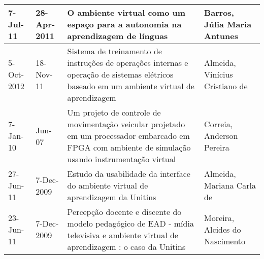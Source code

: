 \begin{table}
{\begin{tabular}{|m{1.3cm}|m{1.3cm}|p{7cm}|p{6cm}|}
7-Jul-11    & 28-Apr-2011 & O ambiente virtual como um espaço para a autonomia na aprendizagem de línguas                                                                                                                                         & Barros, Júlia Maria Antunes                                                                                                                                                                                                                                  \\ \hline
5-Oct-2012  & 18-Nov-11   & Sistema de treinamento de instruções de operações internas e operação de sistemas elétricos baseado em um ambiente virtual de aprendizagem                                                                            & Almeida, Vinícius Cristiano de                                                                                                                                                                                                                               \\ \hline
7-Jan-10    & Jun-07      & Um projeto de controle de movimentação veicular projetado em um processador embarcado em FPGA com ambiente de simulação usando instrumentação virtual                                                                 & Correia, Anderson Pereira                                                                                                                                                                                                                                    \\ \hline
27-Jun-11   & 7-Dec-2009  & Estudo da usabilidade da interface do ambiente virtual de aprendizagem da Unitins                                                                                                                                     & Almeida, Mariana Carla de                                                                                                                                                                                                                                    \\ \hline
23-Jun-11   & 7-Dec-2009  & Percepção docente e discente do modelo pedagógico de EAD - mídia televisiva e ambiente virtual de aprendizagem : o caso da Unitins                                                                                    & Moreira, Alcides do Nascimento                                                                                                                                                                                                                               \\ \hline

\end{tabular}}
\end{table}
